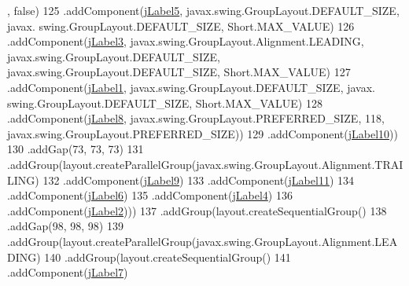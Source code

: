 \begin{DoxyCode}
      , \textcolor{keyword}{false})
125                                 .addComponent(\mbox{\hyperlink{class_interfaz_package_1_1_verificar_libro_af0ca29553abca825c883eacf5e075ce6}{jLabel5}}, javax.swing.GroupLayout.DEFAULT\_SIZE, javax.
      swing.GroupLayout.DEFAULT\_SIZE, Short.MAX\_VALUE)
126                                 .addComponent(\mbox{\hyperlink{class_interfaz_package_1_1_verificar_libro_a07f26adefc6f29a9f6335d4eceac2a96}{jLabel3}}, javax.swing.GroupLayout.Alignment.LEADING, 
      javax.swing.GroupLayout.DEFAULT\_SIZE, javax.swing.GroupLayout.DEFAULT\_SIZE, Short.MAX\_VALUE)
127                                 .addComponent(\mbox{\hyperlink{class_interfaz_package_1_1_verificar_libro_ae036e1136fd3ea0a459815b6fbad2974}{jLabel1}}, javax.swing.GroupLayout.DEFAULT\_SIZE, javax.
      swing.GroupLayout.DEFAULT\_SIZE, Short.MAX\_VALUE)
128                                 .addComponent(\mbox{\hyperlink{class_interfaz_package_1_1_verificar_libro_a31cbff3e8a6d5b60fc95e9ee6505ffaf}{jLabel8}}, javax.swing.GroupLayout.PREFERRED\_SIZE, 118, 
      javax.swing.GroupLayout.PREFERRED\_SIZE))
129                             .addComponent(\mbox{\hyperlink{class_interfaz_package_1_1_verificar_libro_a5107c81876e9d94ddd9d39f3c2102814}{jLabel10}}))
130                         .addGap(73, 73, 73)
131                         .addGroup(layout.createParallelGroup(javax.swing.GroupLayout.Alignment.TRAILING)
132                             .addComponent(\mbox{\hyperlink{class_interfaz_package_1_1_verificar_libro_ad47175a24ea896af5265b3635c95852e}{jLabel9}})
133                             .addComponent(\mbox{\hyperlink{class_interfaz_package_1_1_verificar_libro_af2c91db62099138d0bffd934b6e470ed}{jLabel11}})
134                             .addComponent(\mbox{\hyperlink{class_interfaz_package_1_1_verificar_libro_a5ed33c5473e49a9a27a02f94f1152818}{jLabel6}})
135                             .addComponent(\mbox{\hyperlink{class_interfaz_package_1_1_verificar_libro_a3df20770732e9526771c5a14aa5afb6a}{jLabel4}})
136                             .addComponent(\mbox{\hyperlink{class_interfaz_package_1_1_verificar_libro_ae1649adac4d57368e1c269c7dfa7ea8e}{jLabel2}})))
137                     .addGroup(layout.createSequentialGroup()
138                         .addGap(98, 98, 98)
139                         .addGroup(layout.createParallelGroup(javax.swing.GroupLayout.Alignment.LEADING)
140                             .addGroup(layout.createSequentialGroup()
141                                 .addComponent(\mbox{\hyperlink{class_interfaz_package_1_1_verificar_libro_a6e28a406ea8abbcc35d06c8ea648882c}{jLabel7}})

\end{DoxyCode}
